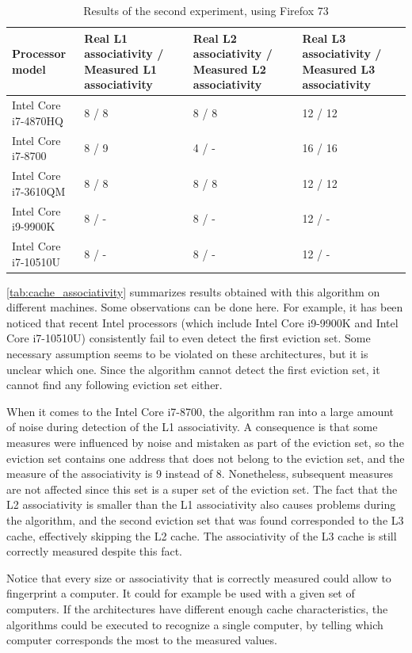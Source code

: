 \documentclass[a4paper,11pt,oneside]{report}
\begin{document}
\begin{table}
\centering
\begin{tabular}{ |p{3cm}||p{3cm}|p{3cm}|p{3cm}|  }
 \hline
 Processor model & Real L1 associativity / Measured L1 associativity & Real L2 associativity / Measured L2 associativity & Real L3 associativity / Measured L3 associativity \\
 \hline
 Intel Core i7-4870HQ & 8 / 8 &8 / 8&12 / 12\\
 \hline
 Intel Core i7-8700 & 8 / 9 & 4 / - & 16 / 16\\
 \hline
 Intel Core i7-3610QM & 8 / 8 &8 / 8&12 / 12\\
 \hline
 Intel Core i9-9900K & 8 / - &8 / -&12 / -\\
 \hline
 Intel Core i7-10510U & 8 / - &8 / -&12 / -\\
 \hline
\end{tabular}
\caption{Results of the second experiment, using Firefox 73}
\label{tab:cache_associativity}
\end{table}

\autoref{tab:cache_associativity} summarizes results obtained with this algorithm on different machines. Some observations can be done here. For example, it has been noticed that recent Intel processors (which include Intel Core i9-9900K and Intel Core i7-10510U) consistently fail to even detect the first eviction set. Some necessary assumption seems to be violated on these architectures, but it is unclear which one. Since the algorithm cannot detect the first eviction set, it cannot find any following eviction set either.

When it comes to the Intel Core i7-8700, the algorithm ran into a large amount of noise during detection of the L1 associativity. A consequence is that some measures were influenced by noise and mistaken as part of the eviction set, so the eviction set contains one address that does not belong to the eviction set, and the measure of the associativity is 9 instead of 8. Nonetheless, subsequent measures are not affected since this set is a super set of the eviction set. The fact that the L2 associativity is smaller than the L1 associativity also causes problems during the algorithm, and the second eviction set that was found corresponded to the L3 cache, effectively skipping the L2 cache. The associativity of the L3 cache is still correctly measured despite this fact.

Notice that every size or associativity that is correctly measured could allow to fingerprint a computer. It could for example be used with a given set of computers. If the architectures have different enough cache characteristics, the algorithms could be executed to recognize a single computer, by telling which computer corresponds the most to the measured values.
\end{document}
